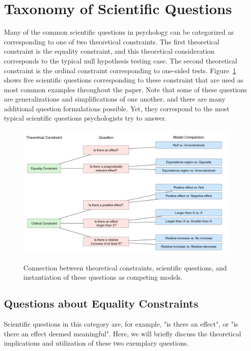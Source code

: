 \documentclass[natbib,doc,12pt,floatsintext]{apa6}
\begin{document}
\section{Taxonomy of Scientific Questions}

Many of the common scientific questions in psychology can be categorized as corresponding to one of two theoretical constraints. The first theoretical constraint is the equality constraint, and this theoretical consideration corresponds to the typical null hypothesis testing case. The second theoretical constraint is the ordinal constraint corresponding to one-sided tests. Figure~\ref{fig:questiontree} shows five scientific questions corresponding to these constraint that are used as most common examples throughout the paper. Note that some of these questions are generalizations and simplifications of one another, and there are many additional question formulations possible. Yet, they correspond to the most typical scientific questions psychologists try to answer.

\begin{figure}[h]
\caption{Connection between theoretical constraints, scientific questions, and instantiation of these questions as competing models.}
\centering
\includegraphics[width=1\textwidth]{questiontree.png}
\label{fig:questiontree}
\end{figure}

\subsection{Questions about Equality Constraints}

Scientific questions in this category are, for example, "is there an effect", or "is there an effect deemed meaningful". Here, we will briefly discuss the theoretical implications and utilization of these two exemplary questions.
\end{document}
